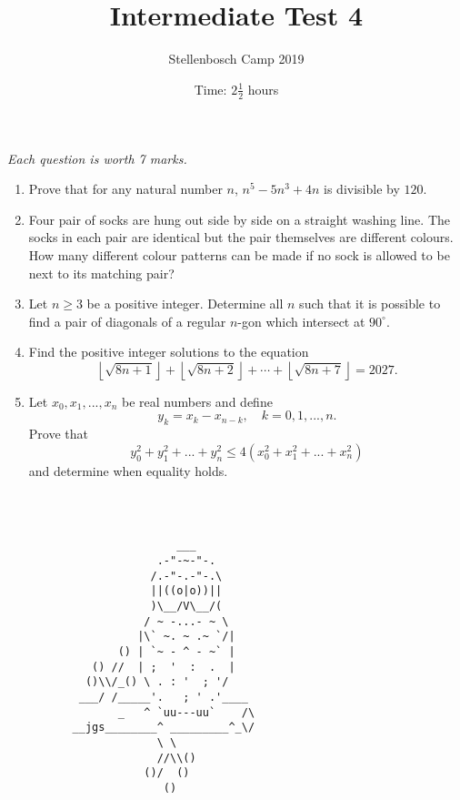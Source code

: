 \documentclass{article}
\title{Intermediate Test 4}
\author{Stellenbosch Camp 2019}
\date{Time: $2\frac{1}{2}$ hours}
\begin{document}
\maketitle
\thispagestyle{empty}

\hfill\textit{Each question is worth 7 marks.}

\vfill
\vfill


\begin{enumerate}[1.]

\item %
Prove that for any natural number $n$, $n^5-5n^3+4n$ is divisible by $120$. 


\vfill

\item %
Four pair of socks are hung out side by side on a straight washing line.
The socks in each pair are identical but the pair themselves are different colours.
How many different colour patterns can be made if no sock is allowed to be next to its matching pair?


\vfill

\item %
Let $n\geq3$ be a positive integer.
Determine all $n$ such that it is possible to find a pair of diagonals of a regular $n$-gon which intersect at $90^\circ$.


\vfill

\item %
\newcommand{\floorsqrt}[1]{\left\lfloor\sqrt{#1}\right\rfloor}
Find the positive integer solutions to the equation
\[ \floorsqrt{8n+1} +\floorsqrt{8n+2} +\dotsb +\floorsqrt{8n+7} = 2027. \]


\vfill

\item %
Let $x_0, x_1,..., x_n$ be real numbers and define
\[y_k=x_k-x_{n-k}, \quad k=0,1,...,n.\]
Prove that 
\[y_0^2+ y_1^2+...+ y_n^2 \leq 4(x_0^2 + x_1^2 + ... + x_n^2) \]
and determine when equality holds.


\end{enumerate}


\vfill
\vfill
\begin{center}
\begin{BVerbatim}



                          ___
                       .-"-~-"-.
                      /.-"-.-"-.\
                      ||((o|o))||
                      )\__/V\__/(
                     / ~ -...- ~ \
                    |\` ~. ~ .~ `/|
                 () | `~ - ^ - ~` |
             () //  | ;  '  :  .  |
            ()\\/_() \ . : '  ; '/
           ___/ /_____'.   ; ' .'____
                 _   ^ `uu---uu`    /\
          __jgs________^ _________^_\/
                       \ \
                       //\\()
                     ()/  ()
                        ()

\end{BVerbatim}
\end{center}
\end{document}
